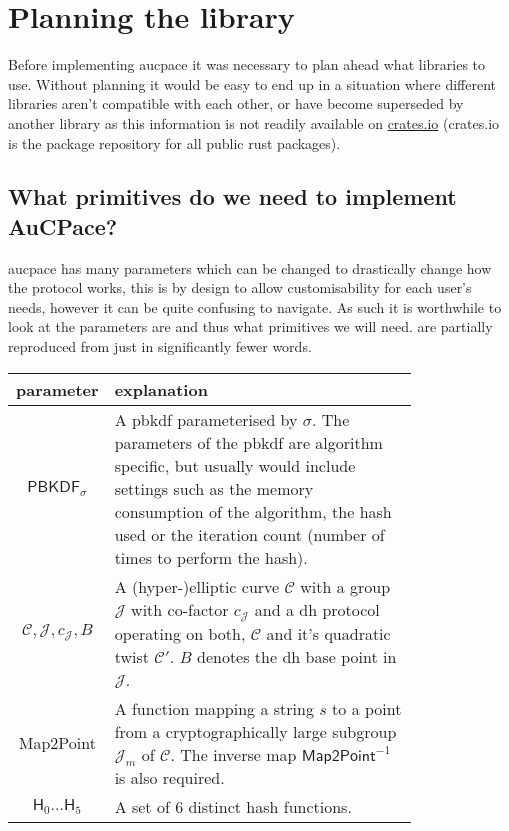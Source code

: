 \section{Planning the library}
Before implementing \gls{aucpace} it was necessary to plan ahead what libraries to use.
Without planning it would be easy to end up in a situation where different libraries aren't compatible with each other, or have become superseded by another library as this information is not readily available on \href{https://crates.io/}{crates.io} (crates.io is the package repository for all public rust packages).

\subsection{What primitives do we need to implement AuCPace?}
\gls{aucpace} has many parameters which can be changed to drastically change how the protocol works, this is by design to allow customisability for each user's needs, however it can be quite confusing to navigate.
As such it is worthwhile to look at the parameters are and thus what primitives we will need.
 are partially reproduced from \cite{aucpace} just in significantly fewer words.

\begin{center}
  \label{tab:aucpace-params}
  \begin{tabular}{ cp{0.8\linewidth} }
    \toprule
    parameter & explanation \\
    \midrule
    $\textsf{PBKDF}_{\sigma}$ & A \gls{pbkdf} parameterised by $\sigma$.
    The parameters of the \gls{pbkdf} are algorithm specific, but usually would include settings such as the memory consumption of the algorithm, the hash used or the iteration count (number of times to perform the hash). \\
    $\mathcal{C}, \mathcal{J}, c_{\mathcal{J}}, B$ & A (hyper-)elliptic curve $\mathcal{C}$ with a group $\mathcal{J}$ with co-factor $c_{\mathcal{J}}$ and a \gls{dh} protocol operating on both, $\mathcal{C}$ and it's quadratic twist $\mathcal{C}'$. $B$ denotes the \gls{dh} base point in $\mathcal{J}$.\\
    \textsf{Map2Point} & A function mapping a string $s$ to a point from a cryptographically large subgroup $\mathcal{J}_m$ of $\mathcal{C}$. The inverse map $\textsf{Map2Point}^{-1}$ is also required.\\
    $\textsf{H}_0 \dots \textsf{H}_5$ & A set of 6 distinct hash functions.\\
    \bottomrule
  \end{tabular}
\end{center}

